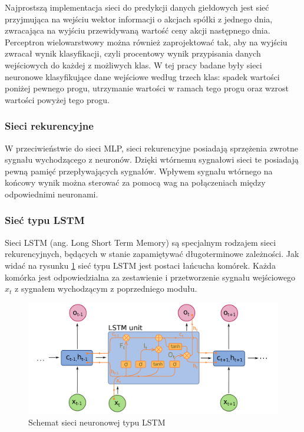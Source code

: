 \documentclass[a4paper, twoside, 11pt, openright]{article}
\begin{document}
Najprostszą implementacja sieci do predykcji danych giełdowych jest sieć przyjmująca na wejściu wektor informacji o akcjach spółki z jednego dnia, zwracająca na wyjściu przewidywaną wartość ceny akcji następnego dnia. Perceptron wielowarstwowy można również zaprojektować tak, aby na wyjściu zwracał wynik klasyfikacji, czyli procentowy wynik przypisania danych wejściowych do każdej z możliwych klas. W tej pracy badane były sieci neuronowe klasyfikujące dane wejściowe według trzech klas: spadek wartości poniżej pewnego progu, utrzymanie wartości w ramach tego progu oraz wzrost wartości powyżej tego progu. 


\subsubsection{Sieci rekurencyjne}

W przeciwieństwie do sieci MLP, sieci rekurencyjne posiadają sprzężenia zwrotne sygnału wychodzącego z neuronów. Dzięki wtórnemu sygnałowi sieci te posiadają pewną pamięć przepływających sygnałów. Wpływem sygnału wtórnego na końcowy wynik można sterować za pomocą wag na połączeniach między odpowiednimi neuronami.

\subsubsection{Sieć typu LSTM \cite{lstm}}

Sieci LSTM (ang. Long Short Term Memory) są specjalnym rodzajem sieci rekurencyjnych, będących w stanie zapamiętywać długoterminowe zależności. Jak widać na rysunku \ref{lstm-net} sieć typu LSTM jest postaci łańcucha komórek. Każda komórka jest odpowiedzialna za zestawienie i przetworzenie sygnału wejściowego $x_t$ z sygnałem wychodzącym z poprzedniego modułu.

\begin{figure}[H]
\centering \includegraphics[scale=0.22]{img/lstm.png}
\caption{Schemat sieci neuronowej typu LSTM \cite{lstm-scheme}}
\label{lstm-net}
\end{figure}
\end{document}
